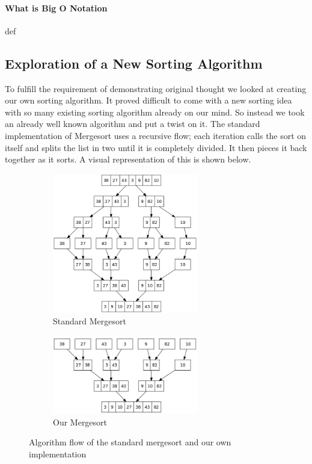 \documentclass[12pt]{article}
\begin{document}
	\paragraph{What is Big O Notation}
	
	def 
	
	\subsection{Exploration of a New Sorting Algorithm}
	
	
	To fulfill the requirement of demonstrating original thought we looked at creating our own sorting algorithm.
	 It proved difficult to come with a new sorting idea with so many existing sorting algorithm already on our mind.
	So instead we took an already well known algorithm and put a twist on it. 
	The standard implementation of Mergesort uses a recursive flow; each iteration calls the sort on itself and splits the list in two until it is completely divided. 
	It then pieces it back together as it sorts. 
	A visual representation of this is shown below.
	
	
\begin{figure}[H]
	
	\begin{subfigure}{0.5\textwidth}
		\includegraphics[width=2.5in]{Merge_sort_algorithm_diagram.png} 
		\caption{Standard Mergesort}
		\label{fig:stdmerge}
	\end{subfigure}
	\begin{subfigure}{0.5\textwidth}
		\includegraphics[width=2.5in]{New_merge_sort_algorithm_diagram.png}
		\caption{Our Mergesort}
		\label{fig:newmerge}
	\end{subfigure}
	
	\caption{Algorithm flow of the standard mergesort and our own implementation}
	\label{fig:bothmerge}
\end{figure}
	
\end{document}
